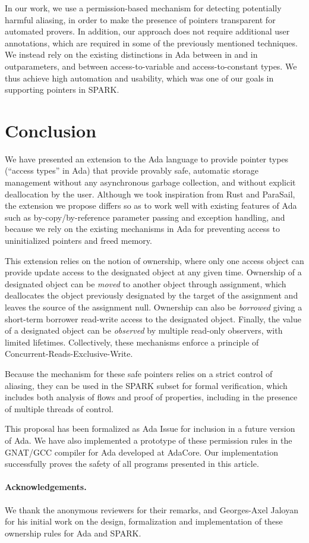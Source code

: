 \documentclass{llncs}
\newcommand{\keyword}[1]{\textsf{#1}}
\begin{document}
In our work, we use a permission-based mechanism for detecting potentially harmful aliasing, in order to make the presence of pointers transparent for automated provers.
In addition, our approach does not require additional user annotations, which are required in some of the previously mentioned techniques.  We instead rely on the existing distinctions in Ada between \keyword{in} and \keyword{in out}parameters, and between access-to-variable and access-to-constant types. We thus achieve high automation
and usability, which was one of our goals in supporting pointers in SPARK.


\section{Conclusion}
We have presented an extension to the Ada language to provide pointer types (``access types'' in Ada) that provide provably safe, automatic
storage management without any asynchronous garbage collection, and without explicit deallocation by the user. Although we took inspiration
from Rust and ParaSail, the extension we propose differs so as to work well with existing features of Ada such
as by-copy/by-reference parameter passing and exception handling, and because we rely on the existing mechanisms in Ada for preventing access
to uninitialized pointers and freed memory.

This extension relies on the notion of ownership, where only one access object can provide update access to the designated object at any given time.
Ownership of a designated object can be \textit{moved} to another object through assignment, which deallocates the object previously designated
by the target of the assignment and leaves the source of the assignment null. Ownership can also be \textit{borrowed} giving a short-term borrower read-write access to the designated object.  Finally, the value of a designated object can be \textit{observed} by multiple
read-only observers, with limited lifetimes. Collectively, these mechanisms enforce a principle of Concurrent-Reads-Exclusive-Write.

Because the mechanism for these safe pointers relies on a strict control of aliasing, they can be used in the SPARK subset for formal verification, which
includes both analysis of flows and proof of properties, including in the presence of multiple threads of control.

This proposal has been formalized as Ada Issue \cite{AI2018} for inclusion in a future version of Ada. We have also implemented a prototype of these permission rules in the GNAT/GCC
compiler for Ada developed at AdaCore. Our implementation successfully proves the safety of all programs presented in this article.

\paragraph{Acknowledgements.} We thank the anonymous reviewers for their
remarks, and Georges-Axel Jaloyan for his initial work on the design,
formalization and implementation of these ownership rules for Ada and SPARK.

\printbibliography[title={References}]
\end{document}
